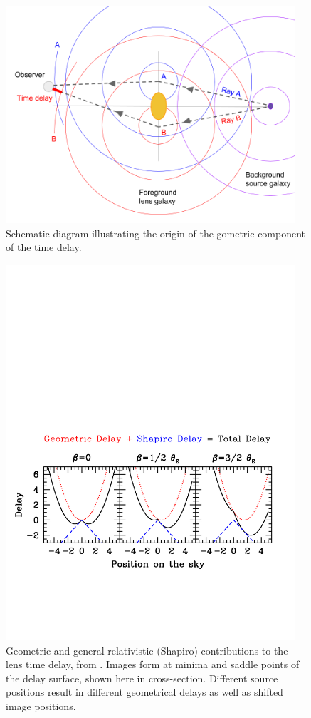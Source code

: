 \begin{figure}[!t]
\centering\includegraphics[width=0.96\textwidth]{figures/wavefront-schematic.png}
\caption{Schematic diagram
illustrating the origin of the gometric component of the time delay.}
\label{fig:timedelaycartoon}
\end{figure}

\begin{figure}[!ht]
\centering\includegraphics[width=0.96\textwidth]{figures/delays.pdf}
\caption{Geometric and general relativistic (Shapiro) contributions
to the lens time delay, from \citep{T+E15}. Images form
at minima and saddle points of the delay surface, shown here in
cross-section. Different source positions result in different
geometrical delays as well as shifted image positions.}
\label{fig:delays}
\end{figure}

